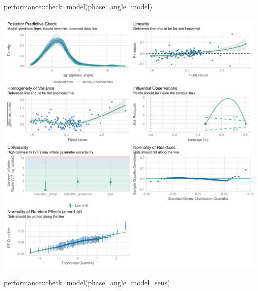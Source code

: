 \documentclass[
  letterpaper,
  DIV=11,
  numbers=noendperiod]{scrartcl}
\newenvironment{Shaded}{\begin{snugshade}}{\end{snugshade}}
\newcommand{\FunctionTok}[1]{\textcolor[rgb]{0.28,0.35,0.67}{#1}}
\newcommand{\NormalTok}[1]{\textcolor[rgb]{0.00,0.23,0.31}{#1}}
\newcommand{\SpecialCharTok}[1]{\textcolor[rgb]{0.37,0.37,0.37}{#1}}
\begin{document}
\begin{Shaded}
\begin{Highlighting}[]
\NormalTok{performance}\SpecialCharTok{::}\FunctionTok{check\_model}\NormalTok{(phase\_angle\_model)}
\end{Highlighting}
\end{Shaded}

\includegraphics{Outcomes_V1V2V3_files/figure-pdf/phase_angle_4-1.pdf}

\begin{Shaded}
\begin{Highlighting}[]
\NormalTok{performance}\SpecialCharTok{::}\FunctionTok{check\_model}\NormalTok{(phase\_angle\_model\_sens)}
\end{Highlighting}
\end{Shaded}
\end{document}
